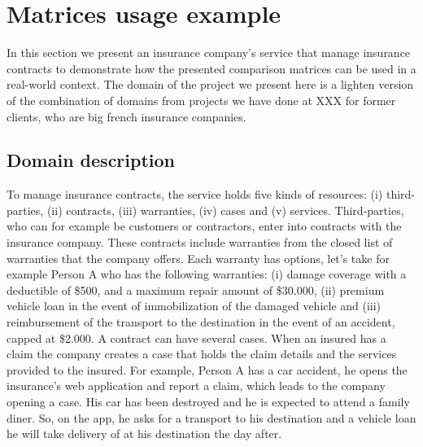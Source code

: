 \section{Matrices usage example}


In this section we present an insurance company's service that manage insurance contracts to demonstrate how the presented comparison matrices can be used in a real-world context. The domain of the project we present here is a lighten version of the combination of domains from projects we have done at XXX for former clients, who are big french insurance companies.

\subsection{Domain description}

To manage insurance contracts, the service holds five kinds of resources: (i) third-parties, (ii) contracts, (iii) warranties, (iv) cases and (v) services. Third-parties, who can for example be customers or contractors, enter into contracts with the insurance company. These contracts include warranties from the closed list of warranties that the company offers. Each warranty has options, let's take for example Person A who has the following warranties: (i) damage coverage with a deductible of \$500, and a maximum repair amount of \$30.000, (ii) premium vehicle loan in the event of immobilization of the damaged vehicle and (iii) reimbursement of the transport to the destination in the event of an accident, capped at \$2.000. A contract can have several cases. When an insured has a claim the company creates a case that holds the claim details and the services provided to the insured. For example, Person A has a car accident, he opens the insurance's web application and report a claim, which leads to the company opening a case. His car has been destroyed and he is expected to attend a family diner. So, on the app, he asks for a transport to his destination and a vehicle loan he will take delivery of at his destination the day after.

